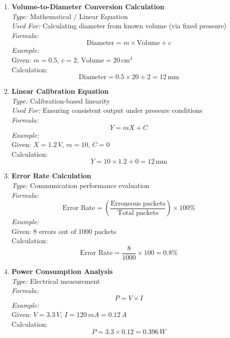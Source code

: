 \documentclass[12pt]{report}
\begin{document}
\begin{enumerate}
    \item \textbf{Volume-to-Diameter Conversion Calculation} \\
    \textit{Type:} Mathematical / Linear Equation \\
    \textit{Used For:} Calculating diameter from known volume (via fixed pressure) \\
    \textit{Formula:} 
    \[
    \text{Diameter} = m \times \text{Volume} + c
    \] 
    \textit{Example:} \\
    Given: \(m = 0.5\), \(c = 2\), \(\text{Volume} = 20\, \text{cm}^3\) \\
    Calculation: 
    \[
    \text{Diameter} = 0.5 \times 20 + 2 = 12\, \text{mm}
    \]

    \item \textbf{Linear Calibration Equation} \\
    \textit{Type:} Calibration-based linearity \\
    \textit{Used For:} Ensuring consistent output under pressure conditions \\
    \textit{Formula:} 
    \[
    Y = mX + C
    \]
    \textit{Example:} \\
    Given: \(X = 1.2\, V\), \(m = 10\), \(C = 0\) \\
    Calculation: 
    \[
    Y = 10 \times 1.2 + 0 = 12\, \text{mm}
    \]

    \item \textbf{Error Rate Calculation} \\
    \textit{Type:} Communication performance evaluation \\
    \textit{Formula:} 
    \[
    \text{Error Rate} = \left(\frac{\text{Erroneous packets}}{\text{Total packets}}\right) \times 100\%
    \]
    \textit{Example:} \\
    Given: 8 errors out of 1000 packets \\
    Calculation: 
    \[
    \text{Error Rate} = \frac{8}{1000} \times 100 = 0.8\%
    \]

    \item \textbf{Power Consumption Analysis} \\
    \textit{Type:} Electrical measurement \\
    \textit{Formula:} 
    \[
    P = V \times I
    \]
    \textit{Example:} \\
    Given: \(V = 3.3\,V\), \(I = 120\,mA = 0.12\,A\) \\
    Calculation: 
    \[
    P = 3.3 \times 0.12 = 0.396\, W
    \]


\end{enumerate}
\end{document}
